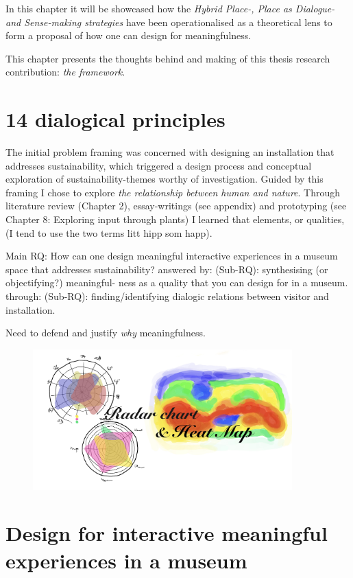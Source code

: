 In this chapter it will be showcased how the \emph{Hybrid Place-, Place as Dialogue- and Sense-making strategies} have been operationalised as a theoretical lens to form a proposal of how one can design for meaningfulness. 

This chapter presents the thoughts behind and making of this thesis research contribution: \emph{the framework}.

\section{14 dialogical principles}

The initial problem framing was concerned with designing an installation that addresses sustainability, which triggered a design process and conceptual exploration of sustainability-themes worthy of investigation. Guided by this framing I chose to explore \emph{the relationship between human and nature}. Through literature review (Chapter 2), essay-writings (see appendix) and prototyping (see Chapter 8: Exploring input through plants) I learned that elements, or qualities, (I tend to use the two terms litt hipp som happ). 


Main RQ: How can one design meaningful interactive experiences in
a museum space that addresses sustainability?
answered by: (Sub-RQ): synthesising (or objectifying?) meaningful-
ness as a quality that you can design for in a museum.
through: (Sub-RQ): finding/identifying dialogic relations between
visitor and installation.

Need to defend and justify \emph{why} meaningfulness. 

\begin{figure}[H]
\centering 
\includegraphics[width=10cm]{pictures/Theory/radar_and_heatmap.jpeg}
\caption{}
\end{figure}


\section{Design for interactive meaningful experiences in a museum}

